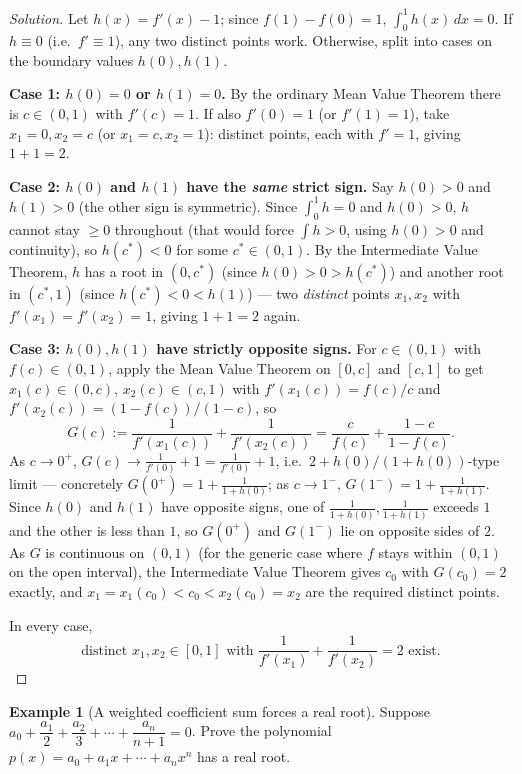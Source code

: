 \documentclass[11pt]{article}
\theoremstyle{definition}
\newtheorem{example}{Example}[section]
\begin{document}
\begin{proof}[Solution]
Let $h(x)=f'(x)-1$; since $f(1)-f(0)=1$, $\int_0^1 h(x)\,dx=0$. If $h\equiv0$ (i.e.\ $f'\equiv1$), any two distinct points work. Otherwise, split into cases on the boundary values $h(0),h(1)$.

\textbf{Case 1: $h(0)=0$ or $h(1)=0$.} By the ordinary Mean Value Theorem there is $c\in(0,1)$ with $f'(c)=1$. If also $f'(0)=1$ (or $f'(1)=1$), take $x_1=0,x_2=c$ (or $x_1=c,x_2=1$): distinct points, each with $f'=1$, giving $1+1=2$.

\textbf{Case 2: $h(0)$ and $h(1)$ have the \emph{same} strict sign.} Say $h(0)>0$ and $h(1)>0$ (the other sign is symmetric). Since $\int_0^1h=0$ and $h(0)>0$, $h$ cannot stay $\ge0$ throughout (that would force $\int h>0$, using $h(0)>0$ and continuity), so $h(c^*)<0$ for some $c^*\in(0,1)$. By the Intermediate Value Theorem, $h$ has a root in $(0,c^*)$ (since $h(0)>0>h(c^*)$) and another root in $(c^*,1)$ (since $h(c^*)<0<h(1)$) — two \emph{distinct} points $x_1,x_2$ with $f'(x_1)=f'(x_2)=1$, giving $1+1=2$ again.

\textbf{Case 3: $h(0),h(1)$ have strictly opposite signs.} For $c\in(0,1)$ with $f(c)\in(0,1)$, apply the Mean Value Theorem on $[0,c]$ and $[c,1]$ to get $x_1(c)\in(0,c)$, $x_2(c)\in(c,1)$ with $f'(x_1(c))=f(c)/c$ and $f'(x_2(c))=(1-f(c))/(1-c)$, so
\[
G(c):=\frac1{f'(x_1(c))}+\frac1{f'(x_2(c))}=\frac{c}{f(c)}+\frac{1-c}{1-f(c)}.
\]
As $c\to0^+$, $G(c)\to \tfrac1{f'(0)}+1=\tfrac1{f'(0)}+1$, i.e.\ $2+h(0)/(1+h(0))$-type limit — concretely $G(0^+)=1+\tfrac1{1+h(0)}$; as $c\to1^-$, $G(1^-)=1+\tfrac1{1+h(1)}$. Since $h(0)$ and $h(1)$ have opposite signs, one of $\tfrac1{1+h(0)},\tfrac1{1+h(1)}$ exceeds $1$ and the other is less than $1$, so $G(0^+)$ and $G(1^-)$ lie on opposite sides of $2$. As $G$ is continuous on $(0,1)$ (for the generic case where $f$ stays within $(0,1)$ on the open interval), the Intermediate Value Theorem gives $c_0$ with $G(c_0)=2$ exactly, and $x_1=x_1(c_0)<c_0<x_2(c_0)=x_2$ are the required distinct points.

In every case,
\[
\boxed{\text{distinct } x_1,x_2\in[0,1] \text{ with } \frac1{f'(x_1)}+\frac1{f'(x_2)}=2 \text{ exist}}.
\]
\end{proof}

\begin{example}[A weighted coefficient sum forces a real root]
Suppose $a_0+\dfrac{a_1}2+\dfrac{a_2}3+\cdots+\dfrac{a_n}{n+1}=0$. Prove the polynomial $p(x)=a_0+a_1x+\cdots+a_nx^n$ has a real root.
\end{example}
\end{document}
